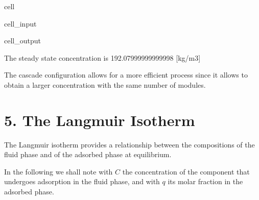 \documentclass[letterpaper,10pt,english]{jupyterBook}
\begin{document}
\begin{sphinxuseclass}{cell}
\begin{sphinxVerbatimInput}
\begin{sphinxuseclass}{cell_input}
\begin{sphinxVerbatim}[commandchars=\\\{\}]
   
\end{sphinxVerbatim}

\end{sphinxuseclass}\end{sphinxVerbatimInput}
\begin{sphinxVerbatimOutput}

\begin{sphinxuseclass}{cell_output}
\begin{sphinxVerbatim}[commandchars=\\\{\}]
The steady state concentration is 192.07999999999998 [kg/m\PYGZca{}3]
\end{sphinxVerbatim}

\end{sphinxuseclass}\end{sphinxVerbatimOutput}

\end{sphinxuseclass}
\sphinxAtStartPar
The cascade configuration allows for a more efficient process since it allows to obtain a larger concentration with the same number of modules.

\sphinxstepscope


\section{5. The Langmuir Isotherm}
\label{\detokenize{Langmuir_isotherm:the-langmuir-isotherm}}\label{\detokenize{Langmuir_isotherm::doc}}
\sphinxAtStartPar
The Langmuir isotherm provides a relationship between the compositions of the fluid phase and of the adsorbed phase at equilibrium.

\sphinxAtStartPar
In the following we shall note with \(C\) the concentration of the component that undergoes adsorption in the fluid phase, and with \(q\) its  molar fraction in the adsorbed phase.
\end{document}
